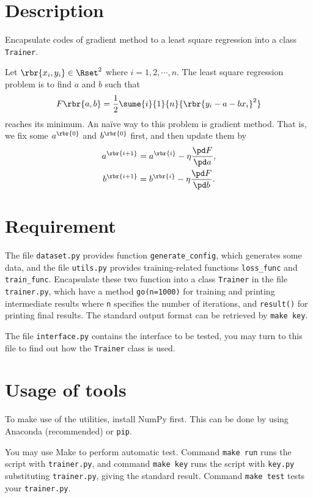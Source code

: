 \documentclass[english, nochinese]{../../TeXTemplate/pkupaper}
\title{\titlemark}
\author{pppppass}
\date{January 23, 2018}
\begin{document}
\maketitle

\section{Description}

Encapsulate codes of gradient method to a least square regression into a class \verb"Trainer".

Let $ \rbr{ x_i, y_i } \in \Rset^2 $ where $ i = 1, 2, \cdots, n $. The least square regression problem is to find $a$ and $b$ such that
\begin{equation}
F \rbr{ a, b } = \frac{1}{2} \sume{i}{1}{n}{\rbr{ y_i - a - b x_i }^2}
\end{equation}
reaches its minimum. An na\"ive way to this problem is gradient method. That is, we fix some $a^{\rbr{0}}$ and $b^{\rbr{0}}$ first, and then update them by
\begin{gather}
a^{\rbr{ i + 1 }} = a^{\rbr{i}} - \eta \frac{ \pd F }{ \pd a }, \\
b^{\rbr{ i + 1 }} = b^{\rbr{i}} - \eta \frac{ \pd F }{ \pd b }.
\end{gather}

\section{Requirement}

The file \verb"dataset.py" provides function \verb"generate_config", which generates some data, and the file \verb"utils.py" provides training-related functions \verb"loss_func" and \verb"train_func". Encapsulate these two function into a class \verb"Trainer" in the file \verb"trainer.py", which have a method \verb"go(n=1000)" for training and printing intermediate results where \verb"n" specifies the number of iterations, and \verb"result()" for printing final results. The standard output format can be retrieved by \verb"make key".

The file \verb"interface.py" contains the interface to be tested, you may turn to this file to find out how the \verb"Trainer" class is used.

\section{Usage of tools}

To make use of the utilities, install NumPy first. This can be done by using Anaconda (recommended) or \verb"pip".

You may use Make to perform automatic test. Command \verb"make run" runs the script with \verb"trainer.py", and command \verb"make key" runs the script with \verb"key.py" substituting \verb"trainer.py", giving the standard result. Command \verb"make test" tests your \verb"trainer.py".
\end{document}
